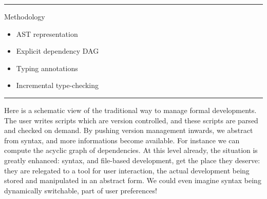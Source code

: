 \documentclass[ignorenonframetext,red]{beamer}
\begin{document}
\hrule
\begin{frame}{Methodology}
  \begin{center}
  \end{center}
  \begin{itemize}
  \item<4-> AST representation
  \item<5-> Explicit dependency DAG
  \item<7-> Typing annotations
  \item<8-> Incremental type-checking
  \end{itemize}
\end{frame}
\hrule

Here is a schematic view of the traditional way to manage formal
developments. The user writes scripts which are version controlled,
and these scripts are parsed and checked on demand. By pushing version
management inwards, we abstract from syntax, and more informations
become available. For instance we can compute the acyclic graph of
dependencies. At this level already, the situation is greatly
enhanced: syntax, and file-based development, get the place they
deserve: they are relegated to a tool for user interaction, the actual
development being stored and manipulated in an abstract form. We could
even imagine syntax being dynamically switchable, part of user
preferences!
\end{document}
